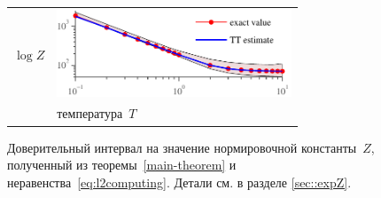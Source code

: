 \begin{figure}
\begin{center}
\begin{tabular}{m{0.3cm}@{}m{7cm}}
\begin{sideways}\parbox{4cm}{\centering\scriptsize  $\log Z$ }\end{sideways}
& \includegraphics[width=7cm]{images/10x10,J=1,average=10,confInt_v3.pdf}
\\
& \parbox{7.3cm}{\centering\scriptsize температура~$T$} \\
\end{tabular}
\end{center}
\caption{Доверительный интервал на значение нормировочной константы~$Z$, полученный из теоремы~\ref{main-theorem} и неравенства~\eqref{eq:l2computing}. Детали см. в разделе \ref{sec::expZ}.  \label{fig:zConf}}
\end{figure}

